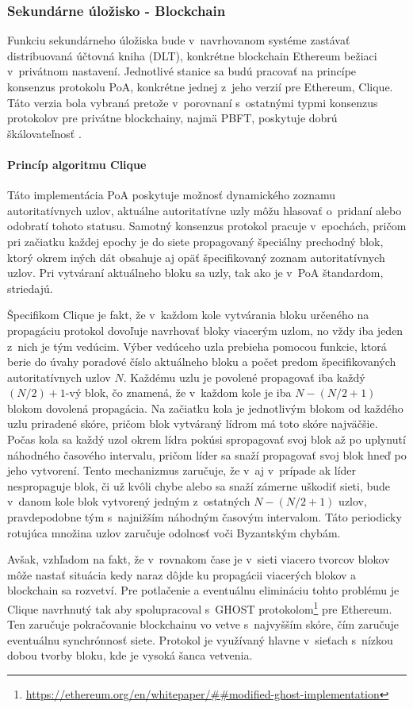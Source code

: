 \subsubsection{Sekundárne úložisko - Blockchain}
Funkciu sekundárneho úložiska bude v~navrhovanom systéme zastávať distribuovaná účtovná kniha (DLT), konkrétne blockchain Ethereum bežiaci v~privátnom nastavení. Jednotlivé stanice sa budú pracovať na princípe konsenzus protokolu PoA, konkrétne jednej z~jeho verzií pre Ethereum, Clique. Táto verzia bola vybraná pretože v~porovnaní s~ostatnými typmi konsenzus protokolov pre privátne blockchainy, najmä PBFT, poskytuje dobrú škálovateľnosť \cite{consensus_perf_comparison}.

\paragraph{Princíp algoritmu Clique}
Táto implementácia PoA poskytuje možnosť dynamického zoznamu autoritatívnych uzlov, aktuálne autoritatívne uzly môžu hlasovať o~pridaní alebo odobratí tohoto statusu. Samotný konsenzus protokol pracuje v~epochách, pričom pri začiatku každej epochy je do siete propagovaný špeciálny prechodný blok, ktorý okrem iných dát obsahuje aj opäť špecifikovaný zoznam autoritatívnych uzlov. Pri vytváraní aktuálneho bloku sa uzly, tak ako je v~PoA štandardom, striedajú.

Špecifikom Clique je fakt, že v~každom kole vytvárania bloku určeného na propagáciu protokol dovoľuje navrhovať bloky viacerým uzlom, no vždy iba jeden z~nich je tým vedúcim. Výber vedúceho uzla prebieha pomocou funkcie, ktorá berie do úvahy poradové číslo aktuálneho bloku a počet predom špecifikovaných autoritatívnych uzlov $N$. Každému uzlu je povolené propagovať iba každý $(N/2) + 1$-vý blok, čo znamená, že v~každom kole je iba $N-(N/2+1)$ blokom dovolená propagácia. Na začiatku kola je jednotlivým blokom od každého uzlu priradené skóre, pričom blok vytváraný lídrom má toto skóre najväčšie. Počas kola sa každý uzol okrem lídra pokúsi spropagovať svoj blok až po uplynutí náhodného časového intervalu, pričom líder sa snaží propagovať svoj blok hneď po jeho vytvorení. Tento mechanizmus zaručuje, že v~aj v~prípade ak líder nespropaguje blok, či už kvôli chybe alebo sa snaží zámerne uškodiť sieti, bude v~danom kole blok vytvorený jedným z~ostatných $N-(N/2+1)$ uzlov, pravdepodobne tým s~najnižším náhodným časovým intervalom. Táto periodicky rotujúca množina uzlov zaručuje odolnosť voči Byzantským chybám.

Avšak, vzhľadom na fakt, že v~rovnakom čase je v~sieti viacero tvorcov blokov môže nastať situácia kedy naraz dôjde ku propagácii viacerých blokov a blockchain sa rozvetví. Pre potlačenie a eventuálnu elimináciu tohto problému je Clique navrhnutý tak aby spolupracoval s~GHOST protokolom\footnote{\url{https://ethereum.org/en/whitepaper/##modified-ghost-implementation}} pre Ethereum. Ten zaručuje pokračovanie blockchainu vo vetve s~najvyšším skóre, čím zaručuje eventuálnu synchrónnosť siete. Protokol je využívaný hlavne v~sieťach s~nízkou dobou tvorby bloku, kde je vysoká šanca vetvenia.

